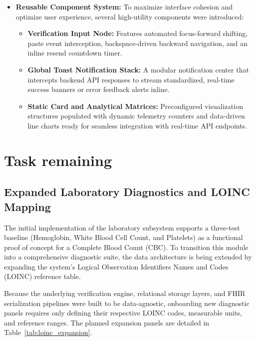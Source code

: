 \documentclass[12pt, a4paper]{report}
\numberwithin{equation}{chapter}
\begin{document}
\begin{itemize}
    \item \textbf{Reusable Component System:} To maximize interface cohesion and optimize user experience, several high-utility components were introduced:
    \begin{itemize}
        \item \textbf{Verification Input Node:} Features automated focus-forward shifting, paste event interception, backspace-driven backward navigation, and an inline resend countdown timer.
        \item \textbf{Global Toast Notification Stack:} A modular notification center that intercepts backend API responses to stream standardized, real-time success banners or error feedback alerts inline.
        \item \textbf{Static Card and Analytical Matrices:} Preconfigured visualization structures populated with dynamic telemetry counters and data-driven line charts ready for seamless integration with real-time API endpoints.
    \end{itemize}
\end{itemize}


\section{Task remaining}

\subsection{Expanded Laboratory Diagnostics and LOINC Mapping}
The initial implementation of the laboratory subsystem supports a three-test baseline (Hemoglobin, White Blood Cell Count, and Platelets) as a functional proof of concept for a Complete Blood Count (CBC). To transition this module into a comprehensive diagnostic suite, the data architecture is being extended by expanding the system's Logical Observation Identifiers Names and Codes (LOINC) reference table. 

Because the underlying verification engine, relational storage layers, and FHIR serialization pipelines were built to be data-agnostic, onboarding new diagnostic panels requires only defining their respective LOINC codes, measurable units, and reference ranges. The planned expansion panels are detailed in Table~\ref{tab:loinc_expansion}.
\end{document}
